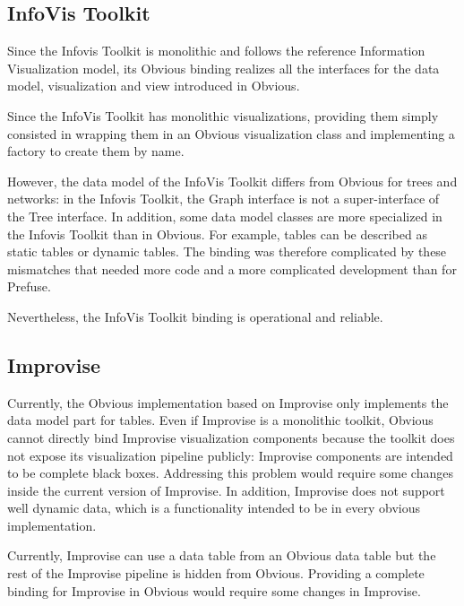 
\subsection{InfoVis Toolkit}

Since the Infovis Toolkit is monolithic and follows the reference
Information Visualization model, its Obvious binding realizes all the
interfaces for the data model, visualization and view introduced in
Obvious.

Since the InfoVis Toolkit has monolithic visualizations, providing
them simply consisted in wrapping them in an Obvious visualization
class and implementing a factory to create them by name.

However, the data model of the InfoVis Toolkit differs from Obvious
for trees and networks: in the Infovis Toolkit, the Graph interface is
not a super-interface of the Tree interface.  In addition, some data
model classes are more specialized in the Infovis Toolkit than in
Obvious. For example, tables can be described as static tables or
dynamic tables.  The binding was therefore complicated by these
mismatches that needed more code and a more complicated development
than for Prefuse.

Nevertheless, the InfoVis Toolkit binding is operational and
reliable.


\subsection{Improvise}

Currently, the Obvious implementation based on Improvise only
implements the data model part for tables.  Even if Improvise is a
monolithic toolkit, Obvious cannot directly bind Improvise
visualization components because the toolkit does not expose its
visualization pipeline publicly: Improvise components are intended to
be complete black boxes.  Addressing this problem would require some
changes inside the current version of Improvise. In addition,
Improvise does not support well dynamic data, which is a functionality
intended to be in every obvious implementation.

Currently, Improvise can use a data table from an Obvious data table
but the rest of the Improvise pipeline is hidden from
Obvious. Providing a complete binding for Improvise in Obvious would
require some changes in Improvise.

